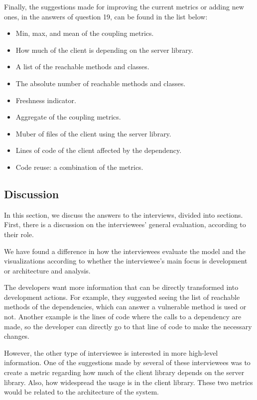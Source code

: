 Finally, the suggestions made for improving the current metrics or adding new ones, in the answers of question 19, can be found in the list below:

\begin{itemize}
  \item Min, max, and mean of the coupling metrics.
  \item How much of the client is depending on the server library.
  \item A list of the reachable methods and classes.
  \item The absolute number of reachable methods and classes.
  \item Freshness indicator.
  \item Aggregate of the coupling metrics.
  \item Muber of files of the client using the server library.
  \item Lines of code of the client affected by the dependency.
  \item Code reuse: a combination of the metrics.
\end{itemize}

\subsection{Discussion}
In this section, we discuss the answers to the interviews, divided into sections. First, there is a discussion on the interviewees' general evaluation, according to their role.

We have found a difference in how the interviewees evaluate the model and the visualizations according to whether the interviewee's main focus is development or architecture and analysis.

The developers want more information that can be directly transformed into development actions. For example, they suggested seeing the list of reachable methods of the dependencies, which can answer a vulnerable method is used or not. Another example is the lines of code where the calls to a dependency are made, so the developer can directly go to that line of code to make the necessary changes.

However, the other type of interviewee is interested in more high-level information. One of the suggestions made by several of these interviewees was to create a metric regarding how much of the client library depends on the server library. Also, how widespread the usage is in the client library. These two metrics would be related to the architecture of the system.

